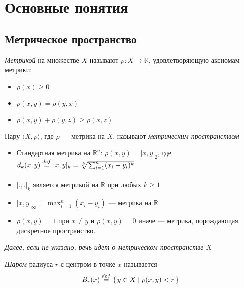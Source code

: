 \chapter{Основные понятия}

\section{Метрическое пространство}

\begin{definition}
    \textit{Метрикой} на множестве $X$ называют $\rho \colon X \to \mathbb{R}$,
    удовлетворяющую аксиомам метрики:
    \begin{itemize}
        \item $\rho(x) \geqslant 0$
        \item $\rho(x, y) = \rho(y, x)$
        \item $\rho(x, y) + \rho(y, z) \geqslant \rho(x, z)$
    \end{itemize}
\end{definition}

\begin{definition}
    Пару $\langle X, \rho \rangle$, где $\rho$ --- метрика на $X$, называют
    \textit{метрическим пространством}
\end{definition}

\begin{examples}
    \enewline
    \begin{itemize}
        \item Стандартная метрика на $\mathbb{R}^n$: $\rho(x, y) = |x, y|_2$,
        где $d_k(x, y) \overset{def}{\underset{}{=}} |x, y|_k = \sqrt[k]{\sum_{i=1}^{n}(x_i - y_i)^k}$
        \item $|., .|_k$ является метрикой на $\mathbb{R}$ при любых $k
        \geqslant 1$
        \item $|x, y|_{\infty} = \max_{i=1}^{n}(x_i - y_i)$ --- метрика
        на $\mathbb{R}$
        \item $\rho(x, y) = 1$ при $x \neq y$ и $\rho(x, y) = 0$ иначе ---
        метрика, порождающая дискретное пространство.
    \end{itemize}
\end{examples}

\textit{Далее, если не указано, речь идет о метрическом пространстве $X$}

\begin{definition}
    \textit{Шаром} радиуса $r$ с центром в точке $x$ называется
\[
    B_r(x) \overset{def}{\underset{}{=}} \{\, y \in X \mid \rho(x, y) < r \,\}
\]
\end{definition}

